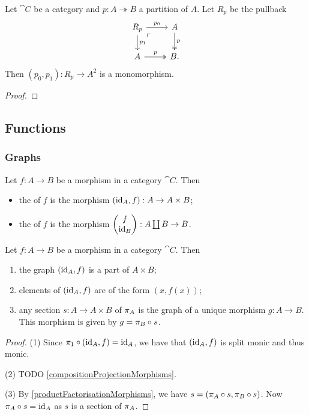 \begin{proposition}
Let $\cat{C}$ be a category and $p: A \twoheadrightarrow B$ a partition of $A$. Let $R_p$ be the pullback
\[ \begin{tikzcd}
R_p \ar[d, "{p_1}"]\ar[r, "{p_0}"] \pbCorner & A \ar[d, twoheadrightarrow, "p"] \\
A \ar[r, twoheadrightarrow, "p"] & B.
\end{tikzcd} \]
Then $(p_0, p_1): R_p \to A^2$ is a monomorphism.
\end{proposition}
\begin{proof}

\end{proof}

\subsection{Functions}
\subsubsection{Graphs}
\begin{definition}
Let $f: A\to B$ be a morphism in a category $\cat{C}$. Then
\begin{itemize}
\item the  of $f$ is the morphism $(\operatorname{id}_A, f): A\to A\times B$;
\item the  of $f$ is the morphism $\begin{pmatrix}
f \\ \operatorname{id}_B
\end{pmatrix}: A\coprod B \to B$.
\end{itemize}
\end{definition}

\begin{proposition}
Let $f: A\to B$ be a morphism in a category $\cat{C}$. Then
\begin{enumerate}
\item the graph $(\operatorname{id}_A, f)$ is a part of $A\times B$;
\item elements of $(\operatorname{id}_A, f)$ are of the form $(x, f(x))$;
\item any section $s: A\to A\times B$ of $\pi_A$ is the graph of a unique morphism $g: A\to B$. This morphism is given by $g = \pi_B \circ s$.
\end{enumerate}
\end{proposition}
\begin{proof}
(1) Since $\pi_1\circ (\operatorname{id}_A, f) = \operatorname{id}_A$, we have that $(\operatorname{id}_A, f)$ is split monic and thus monic.

(2) TODO \ref{compositionProjectionMorphisms}.

(3) By \ref{productFactorisationMorphisms}, we have $s = (\pi_A\circ s, \pi_B\circ s)$. Now $\pi_A\circ s = \operatorname{id}_A$ as $s$ is a section of $\pi_A$.
\end{proof}

